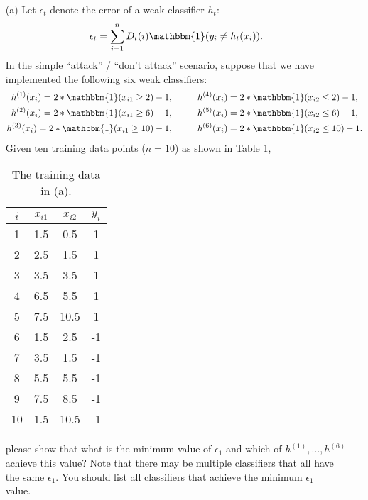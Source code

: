\documentclass[10pt]{article}
\begin{document}
\begin{enumerate}[1.]
	    \begin{itemize}
            \item[(a)] Let $\epsilon_t$ denote the error of a weak classifier $h_t$:
		        \begin{equation}
		            \epsilon_{t} = \sum_{i=1}^{n} D_{t}(i) \mathbbm{1}(y_{i} \neq h_{t}(x_{i})).
		        \end{equation}
		        In the simple “attack” / “don't attack” scenario, suppose that we have implemented the following six weak classifiers:
		        \begin{align*}
		            h^{(1)}(x_{i}) = 2 * \mathbbm{1}(x_{i1} \geq 2) - 1, \hspace{1cm}  & h^{(4)}(x_{i}) = 2 * \mathbbm{1}(x_{i2} \leq 2) - 1,  \\
			        h^{(2)}(x_{i}) = 2 * \mathbbm{1}(x_{i1} \geq 6) - 1, \hspace{1cm}  & h^{(5)}(x_{i}) = 2 * \mathbbm{1}(x_{i2} \leq 6) - 1,  \\
			        h^{(3)}(x_{i}) = 2 * \mathbbm{1}(x_{i1} \geq 10) - 1, \hspace{1cm} & h^{(6)}(x_{i}) = 2 * \mathbbm{1}(x_{i2} \leq 10) - 1. \\
		        \end{align*}
		        Given ten training data points ($n = 10$) as shown in Table 1,
		        \begin{table}[t]
                    \caption{The training data in (a).}
                    \label{table1}
                    \centering
                    \begin{tabular}{|c|cc|c|}
                    \hline
                    $i$ & $x_{i1}$ & $x_{i2}$ & $y_{i}$ \\ \hline
                    1 & 1.5 & 0.5 & 1 \\
                    2 & 2.5 & 1.5 & 1 \\
                    3 & 3.5 & 3.5 & 1 \\
                    4 & 6.5 & 5.5 & 1 \\
                    5 & 7.5 & 10.5 & 1 \\
                    6 & 1.5 & 2.5 & -1 \\
                    7 & 3.5 & 1.5 & -1 \\
                    8 & 5.5 & 5.5 & -1 \\
                    9 & 7.5 & 8.5 & -1 \\
                    10 & 1.5 & 10.5 & -1 \\
                    \hline
                    \end{tabular}
                \end{table}
		        please show that what is the minimum value of $\epsilon_{1}$ and which of $h^{(1)},...,h^{(6)}$ achieve this value? Note that there may be multiple classifiers that all have the same $\epsilon_{1}$. You should list all classifiers that achieve the minimum $\epsilon_{1}$ value.~\\


\end{itemize}
\end{enumerate}
\end{document}
